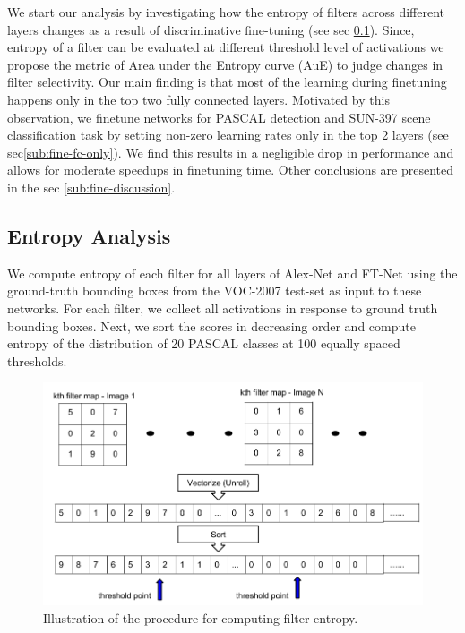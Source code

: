 \documentclass[runningheads]{llncs}
\begin{document}
We start our analysis by investigating how the entropy of filters across different layers changes as a result of discriminative fine-tuning (see sec \ref{sub:fine-entropy}). Since, entropy of a filter can be evaluated at different threshold level of activations we propose the metric of Area under the Entropy curve (AuE) to judge changes in filter selectivity. Our main finding is that most of the learning during finetuning happens only in the top two fully connected layers. Motivated by this observation, we finetune networks for PASCAL detection and SUN-397 scene classification task by setting non-zero learning rates only in the top 2 layers (see sec\ref{sub:fine-fc-only}). We find this results in a negligible drop in performance and allows for moderate speedups in finetuning time. Other conclusions are presented in the sec \ref{sub:fine-discussion}.

\subsection{Entropy Analysis}
\label{sub:fine-entropy}
We compute entropy of each filter for all layers of Alex-Net and FT-Net using the ground-truth bounding boxes from the VOC-2007 test-set as input to these networks. For each filter, we collect all activations in response to ground truth bounding boxes. Next, we sort the scores in decreasing order and compute entropy of the distribution of 20 PASCAL classes at 100 equally spaced thresholds.

\begin{figure}
\centering
\includegraphics[scale=0.15]{images/vectorize.png}
\caption{Illustration of the procedure for computing filter entropy.}
\label{fig:vectorize}
\end{figure}
\end{document}
